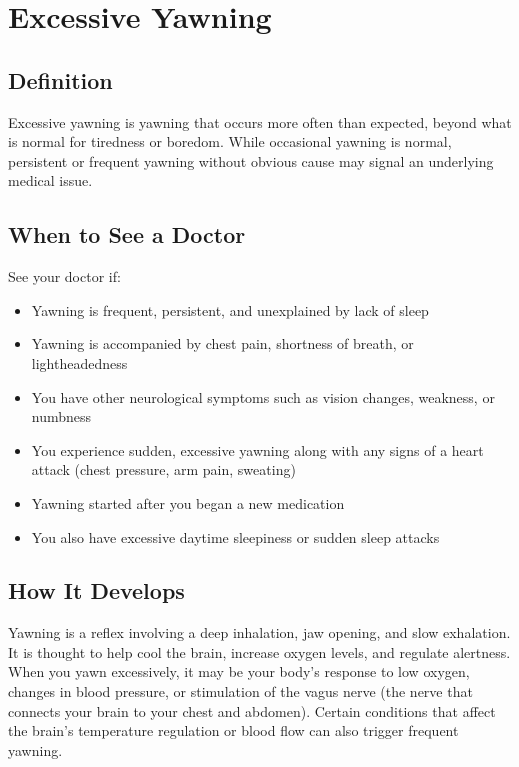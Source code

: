 \chapter{Excessive Yawning}

\section*{Definition}
Excessive yawning is yawning that occurs more often than expected, beyond what is normal for tiredness or boredom. While occasional yawning is normal, persistent or frequent yawning without obvious cause may signal an underlying medical issue.

\section*{When to See a Doctor}
See your doctor if:
\begin{itemize}
  \item Yawning is frequent, persistent, and unexplained by lack of sleep
  \item Yawning is accompanied by chest pain, shortness of breath, or lightheadedness
  \item You have other neurological symptoms such as vision changes, weakness, or numbness
  \item You experience sudden, excessive yawning along with any signs of a heart attack (chest pressure, arm pain, sweating)
  \item Yawning started after you began a new medication
  \item You also have excessive daytime sleepiness or sudden sleep attacks
\end{itemize}

\section*{How It Develops}
Yawning is a reflex involving a deep inhalation, jaw opening, and slow exhalation. It is thought to help cool the brain, increase oxygen levels, and regulate alertness. When you yawn excessively, it may be your body's response to low oxygen, changes in blood pressure, or stimulation of the vagus nerve (the nerve that connects your brain to your chest and abdomen). Certain conditions that affect the brain's temperature regulation or blood flow can also trigger frequent yawning.


